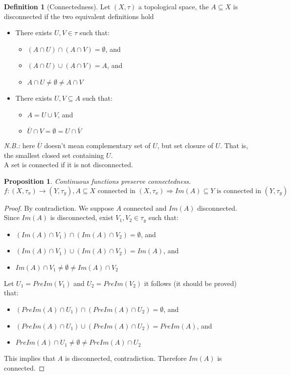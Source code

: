 \documentclass{article}
\newcommand{\Ar}{\Rightarrow}
\newcommand{\f}[3]{#1 : #2 \rightarrow #3}
\theoremstyle{definition}
\newtheorem{definition}{Definition}[section]
\theoremstyle{definition}
\theoremstyle{plain}
\theoremstyle{plain}
\theoremstyle{plain}
\theoremstyle{plain}
\newtheorem{proposition}[theorem]{Proposition}
\theoremstyle{definition}
\theoremstyle{remark}
\theoremstyle{remark}
\theoremstyle{remark}
\theoremstyle{remark}
\begin{document}
\begin{definition}[Connectedness]
  Let $(X, \tau)$ a topological space, the $A \subseteq X$ is disconnected if the two equivalent definitions hold
  \begin{itemize}
    \item There exists $U, V \in \tau$ such that:
    \begin{itemize}
      \item $(A \cap U) \cap (A \cap V) = \emptyset$, and
      \item $(A \cap U) \cup (A \cap V) = A$, and
      \item $A \cap U \neq \emptyset \neq A \cap V$
    \end{itemize}
    \item There exists $U, V \subseteq A$ such that:
    \begin{itemize}
      \item $A = U \cup V$, and
      \item $\overline{U} \cap V = \emptyset = U \cap \overline{V}$
    \end{itemize}
  \end{itemize}
  \textit{N.B.:} here $\overline{U}$ doesn't mean complementary set of $U$, but set closure of $U$. That is, the smallest closed set containing $U$.\\
  A set is connected if it is not disconnected.
\end{definition}


\begin{proposition}
  Continuous functions preserve connectedness.\\
  \[
  \f{f}{(X,\tau_x)}{(Y,\tau_y)}, A \subseteq X \text{ connected in } (X,\tau_x) \Ar Im(A) \subseteq Y \text{ is connected in } (Y,\tau_y)
  \]
\end{proposition}

\begin{proof}
  By contradiction. We suppose $A$ connected and $Im(A)$ disconnected. Since $Im(A)$ is disconnected, exist $V_1, V_2 \in \tau_y$ such that:
  \begin{itemize}
    \item $(Im(A) \cap V_1) \cap (Im(A) \cap V_2) = \emptyset$, and
    \item $(Im(A) \cap V_1) \cup (Im(A) \cap V_2) = Im(A)$, and
    \item $Im(A) \cap V_1 \neq \emptyset \neq Im(A) \cap V_2$
  \end{itemize}
  Let $U_1 = PreIm(V_1)$ and $U_2 = PreIm(V_2)$ it follows (it should be proved) that:
  \begin{itemize}
    \item $(PreIm(A) \cap U_1) \cap (PreIm(A) \cap U_2) = \emptyset$, and
    \item $(PreIm(A) \cap U_1) \cup (PreIm(A) \cap U_2) = PreIm(A)$, and
    \item $PreIm(A) \cap U_1 \neq \emptyset \neq PreIm(A) \cap U_2$
  \end{itemize}
  This implies that $A$ is disconnected, contradiction. Therefore $Im(A)$ is connected.
\end{proof}
\end{document}
